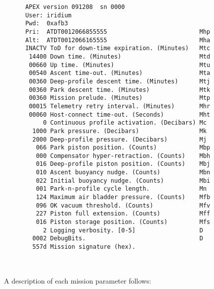 \begin{minipage}{6in}
\begin{verbatim}
      APEX version 091208  sn 0000
      User: iridium                                  
      Pwd:  0xafb3
      Pri:  ATDT0012066855555                          Mhp
      Alt:  ATDT0012066165555                          Mha
      INACTV ToD for down-time expiration. (Minutes)   Mtc
       14400 Down time. (Minutes)                      Mtd
       00660 Up time. (Minutes)                        Mtu
       00540 Ascent time-out. (Minutes)                Mta
       00360 Deep-profile descent time. (Minutes)      Mtj
       00360 Park descent time. (Minutes)              Mtk
       00360 Mission prelude. (Minutes)                Mtp
       00015 Telemetry retry interval. (Minutes)       Mhr
       00060 Host-connect time-out. (Seconds)          Mht
           0 Continuous profile activation. (Decibars) Mc
        1000 Park pressure. (Decibars)                 Mk
        2000 Deep-profile pressure. (Decibars)         Mj
         066 Park piston position. (Counts)            Mbp
         000 Compensator hyper-retraction. (Counts)    Mbh
         016 Deep-profile piston position. (Counts)    Mbj
         010 Ascent buoyancy nudge. (Counts)           Mbn
         022 Initial buoyancy nudge. (Counts)          Mbi
         001 Park-n-profile cycle length.              Mn
         124 Maximum air bladder pressure. (Counts)    Mfb
         096 OK vacuum threshold. (Counts)             Mfv
         227 Piston full extension. (Counts)           Mff
         016 Piston storage position. (Counts)         Mfs
           2 Logging verbosity. [0-5]                  D
        0002 DebugBits.                                D
        557d Mission signature (hex).
      
\end{verbatim}
\end{minipage}\\

A description of each mission parameter follows:


